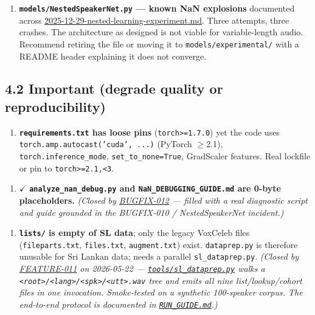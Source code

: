 \documentclass[10pt,a4paper]{article}
\begin{document}
\begin{enumerate}[leftmargin=*,itemsep=2pt]
  \item \textbf{\texttt{models/NestedSpeakerNet.py} --- known NaN explosions} documented across \href{voxceleb_trainer/research_logs/2025-12-29-nested-learning-experiment.md}{2025-12-29-nested-learning-experiment.md}. Three attempts, three crashes. The architecture as designed is not viable for variable-length audio. Recommend retiring the file or moving it to \texttt{models/experimental/} with a README header explaining it does not converge.
\end{enumerate}

\subsection*{4.2 Important (degrade quality or reproducibility)}

\begin{enumerate}[leftmargin=*,itemsep=2pt]
  \item \textbf{\texttt{requirements.txt} has loose pins} (\texttt{torch>=1.7.0}) yet the code uses \texttt{torch.amp.autocast('cuda', ...)} (PyTorch $\geq$2.1), \texttt{torch.inference\_mode}, \texttt{set\_to\_none=True}, GradScaler features. Real lockfile or pin to \texttt{torch>=2.1,<3}.
\end{enumerate}

\begin{enumerate}[leftmargin=*,itemsep=2pt]
  \item {\color{green!50!black}$\checkmark$} \textbf{\texttt{analyze\_nan\_debug.py} and \texttt{NaN\_DEBUGGING\_GUIDE.md} are 0-byte placeholders.} \textit{(Closed by \href{docs/bugfixes/BUGFIX-012-fill-nan-debug-placeholders.md}{BUGFIX-012} --- filled with a real diagnostic script and guide grounded in the BUGFIX-010 / NestedSpeakerNet incident.)}
\end{enumerate}

\begin{enumerate}[leftmargin=*,itemsep=2pt]
  \item \textbf{\texttt{lists/} is empty of SL data}; only the legacy VoxCeleb files (\texttt{fileparts.txt}, \texttt{files.txt}, \texttt{augment.txt}) exist. \texttt{dataprep.py} is therefore unusable for Sri Lankan data; needs a parallel \texttt{sl\_dataprep.py}. \textit{(Closed by \href{docs/bugfixes/FEATURE-011-sl-dataprep.md}{FEATURE-011} on 2026-05-22 --- \href{tools/sl_dataprep.py}{\texttt{tools/sl\_dataprep.py}} walks a \texttt{<root>/<lang>/<spk>/<utt>.wav} tree and emits all nine list/lookup/cohort files in one invocation. Smoke-tested on a synthetic 100-speaker corpus. The end-to-end protocol is documented in \href{RUN_GUIDE.md}{\texttt{RUN\_GUIDE.md}}.)}
\end{enumerate}
\end{document}
